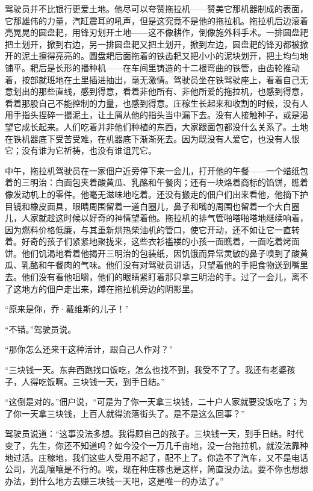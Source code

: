 \documentclass[12pt,UTF-8,openany]{ctexbook}
\begin{document}
\begin{normalsize}
    驾驶员并不比银行更爱土地。他尽可以夸赞拖拉机——赞美它那机器制成的表面，它那雄伟的力量，汽缸震耳的吼声，但是这究竟不是他的拖拉机。拖拉机后边滚着亮晃晃的圆盘耙，用锋刃划开土地——这不像耕作，倒像施外科手术。一排圆盘耙把土划开，掀到右边，另一排圆盘耙又把土划开，掀到左边，圆盘耙的锋刃都被掀开的泥土擦得亮亮的。圆盘耙后面拖着的铁齿耙又把小小的泥块划开，把土均匀地铺平。耙后是长形的播种机——在车间里铸造的十二根弯曲的铁管，由齿轮推动着，按部就班地在土里插进抽出，毫无激情。驾驶员坐在铁驾驶座上，看着自己无意划出的那些直线，感到得意，看着非他所有、非他所爱的拖拉机，也感到得意，看着那股自己不能控制的力量，也感到得意。庄稼生长起来和收割的时候，没有人用手指头捏碎一撮泥土，让土屑从他的指头当中漏下去。没有人接触种子，或是渴望它成长起来。人们吃着并非他们种植的东西，大家跟面包都没什么关系了。土地在铁机器底下受苦受难，在机器底下渐渐死去。因为既没有人爱它，也没有人恨它；没有谁为它祈祷，也没有谁诅咒它。
    
    中午，拖拉机驾驶员在一家佃户近旁停下来一会儿，打开他的午餐——一个蜡纸包着的三明治：白面包夹着酸黄瓜、乳酪和午餐肉；还有一块烙着商标的馅饼，瞧着像发动机上的零件。他毫无滋味地吃着。还没有搬走的佃户们出来看他，他摘下护目镜和橡皮面具，眼睛周围留着一道白圈儿，鼻子和嘴的周围也留着一个大白圈儿，人家就趁这时候以好奇的神情望着他。拖拉机的排气管啪嗒啪嗒地继续响着，因为燃料价格低廉，与其重新烘热柴油机的管口，使它开动，还不如让它一直转着。好奇的孩子们紧紧地聚拢来，这些衣衫褴褛的小孩一面瞧着，一面吃着烤面饼。他们饥渴地看着他揭开三明治的包装纸，因饥饿而异常灵敏的鼻子嗅到了酸黄瓜、乳酪和午餐肉的气味。他们没有对驾驶员讲话，只望着他的手把食物送到嘴里去。他们没有看他咀嚼，他们的眼睛紧盯着那只拿三明治的手。过了一会儿，离不了这地方的佃户走出来，蹲在拖拉机旁边的阴影里。
    
    “原来是你，乔·戴维斯的儿子！”
    
    “不错。”驾驶员说。
    
    “那你怎么还来干这种活计，跟自己人作对？”
    
    “三块钱一天。东奔西跑找口饭吃，怎么也找不到，我受不了了。我还有老婆孩子，人得吃饭啊。三块钱一天，到手日结。”
    
    “这倒是对的。”佃户说，“可是为了你一天拿三块钱，二十户人家就要没饭吃了；为了你一天拿三块钱，上百人就得流落街头了。是不是这么回事？”
    
    驾驶员说道：“这事没法多想。我得顾自己的孩子。三块钱一天，到手日结。时代变了，先生，你还不知道吗？如今没个一万几千亩地，没一台拖拉机，就没法靠种地过活。庄稼地，我们这些人受用不起了，配不上了。你造不了汽车，又不是电话公司，光乱嚷嚷是不行的。唉，现在种庄稼也是这样，简直没办法。要不你也想想办法，到什么地方去赚三块钱一天吧，这是唯一的办法了。”
    

\end{normalsize}
\end{document}
